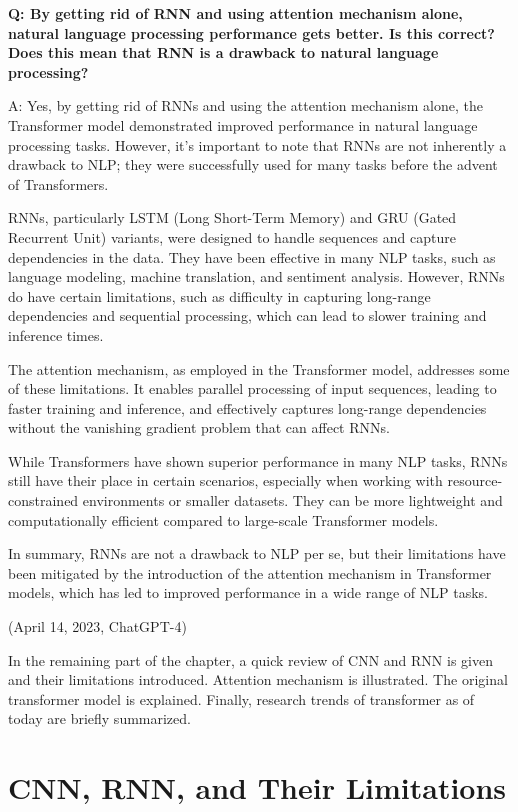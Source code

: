 \begin{shortbox}
	\textbf{Q: By getting rid of RNN and using attention mechanism alone, natural language processing performance gets better. Is this correct? Does this mean that RNN is a drawback to natural language processing?}
	
	A: Yes, by getting rid of RNNs and using the attention mechanism alone, the Transformer model demonstrated improved performance in natural language processing tasks. However, it's important to note that RNNs are not inherently a drawback to NLP; they were successfully used for many tasks before the advent of Transformers.
	
	RNNs, particularly LSTM (Long Short-Term Memory) and GRU (Gated Recurrent Unit) variants, were designed to handle sequences and capture dependencies in the data. They have been effective in many NLP tasks, such as language modeling, machine translation, and sentiment analysis. However, RNNs do have certain limitations, such as difficulty in capturing long-range dependencies and sequential processing, which can lead to slower training and inference times.
	
	The attention mechanism, as employed in the Transformer model, addresses some of these limitations. It enables parallel processing of input sequences, leading to faster training and inference, and effectively captures long-range dependencies without the vanishing gradient problem that can affect RNNs.
	
	While Transformers have shown superior performance in many NLP tasks, RNNs still have their place in certain scenarios, especially when working with resource-constrained environments or smaller datasets. They can be more lightweight and computationally efficient compared to large-scale Transformer models.
	
	In summary, RNNs are not a drawback to NLP per se, but their limitations have been mitigated by the introduction of the attention mechanism in Transformer models, which has led to improved performance in a wide range of NLP tasks.
	
	(April 14, 2023, ChatGPT-4)
\end{shortbox}

In the remaining part of the chapter, a quick review of CNN and RNN is given and their limitations introduced. Attention mechanism is illustrated. The original transformer model is explained. Finally, research trends of transformer as of today are briefly summarized.

\section{CNN, RNN, and Their Limitations}

